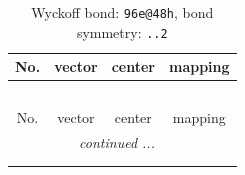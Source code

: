 \documentclass[fleqn,8pt]{jsarticle}
\begin{document}
\renewcommand{\arraystretch}{1.2}
\begin{longtable}{cccc}
\caption{Wyckoff bond: {\tt 96e@48h}, bond symmetry: {\tt ..2}}
 \\
 \hline \hline
No. & vector & center & mapping \\ \hline \endfirsthead

\multicolumn{3}{l}{\tablename\ \thetable{}} \\
 \hline \hline
No. & vector & center & mapping \\ \hline \endhead

 \hline \hline
\multicolumn{3}{r}{\footnotesize\it continued ...} \\ \endfoot

 \hline \hline
\multicolumn{3}{r}{} \\ \endlastfoot


\end{longtable}
\end{document}
